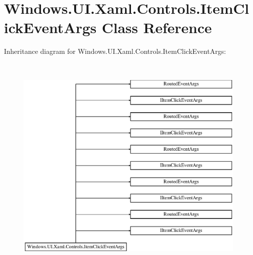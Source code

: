 \hypertarget{class_windows_1_1_u_i_1_1_xaml_1_1_controls_1_1_item_click_event_args}{}\section{Windows.\+U\+I.\+Xaml.\+Controls.\+Item\+Click\+Event\+Args Class Reference}
\label{class_windows_1_1_u_i_1_1_xaml_1_1_controls_1_1_item_click_event_args}
Inheritance diagram for Windows.\+U\+I.\+Xaml.\+Controls.\+Item\+Click\+Event\+Args\+:\begin{figure}[H]
\begin{center}
\leavevmode
\includegraphics[height=10.960854cm]{class_windows_1_1_u_i_1_1_xaml_1_1_controls_1_1_item_click_event_args}
\end{center}
\end{figure}
